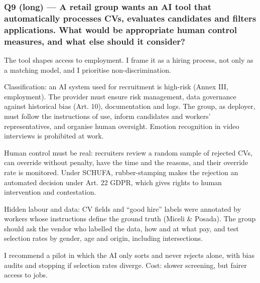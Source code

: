 \documentclass[11pt,a4paper]{article}
\newcommand{\blk}[1]{{\setlength{\fboxsep}{2pt}\colorbox{ink}{\sffamily\footnotesize\bfseries\color{white}\,#1\,}}}
\begin{document}
\subsubsection*{Q9 (long) — A retail group wants an AI tool that automatically processes CVs, evaluates candidates and filters applications. What would be appropriate human control measures, and what else should it consider?}
\begin{description}[leftmargin=1.2cm,style=sameline]
\item[\blk{F}] The tool shapes access to employment. I frame it as a hiring process, not only as a matching model, and I prioritise non-discrimination.
\item[\blk{A1}] Classification: an AI system used for recruitment is high-risk (Annex III, employment). The provider must ensure risk management, data governance against historical bias (Art. 10), documentation and logs. The group, as deployer, must follow the instructions of use, inform candidates and workers’ representatives, and organise human oversight. Emotion recognition in video interviews is prohibited at work.
\item[\blk{A2}] Human control must be real: recruiters review a random sample of rejected CVs, can override without penalty, have the time and the reasons, and their override rate is monitored. Under SCHUFA, rubber-stamping makes the rejection an automated decision under Art. 22 GDPR, which gives rights to human intervention and contestation.
\item[\blk{A3}] Hidden labour and data: CV fields and “good hire” labels were annotated by workers whose instructions define the ground truth (Miceli \& Posada). The group should ask the vendor who labelled the data, how and at what pay, and test selection rates by gender, age and origin, including intersections.
\item[\blk{R}] I recommend a pilot in which the AI only sorts and never rejects alone, with bias audits and stopping if selection rates diverge. Cost: slower screening, but fairer access to jobs.
\end{description}
\end{document}
